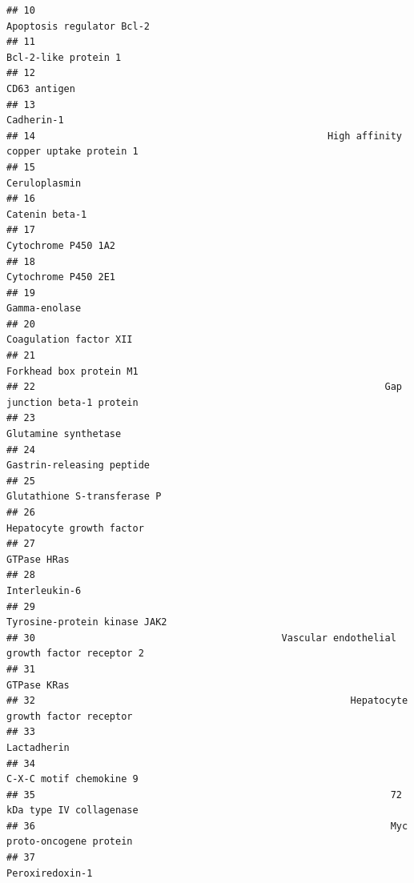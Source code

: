 \documentclass[
]{article}
\begin{document}
\begin{verbatim}
## 10                                                                Apoptosis regulator Bcl-2
## 11                                                                    Bcl-2-like protein 1 
## 12                                                                            CD63 antigen 
## 13                                                                              Cadherin-1 
## 14                                                   High affinity copper uptake protein 1 
## 15                                                                           Ceruloplasmin 
## 16                                                                          Catenin beta-1 
## 17                                                                     Cytochrome P450 1A2 
## 18                                                                     Cytochrome P450 2E1 
## 19                                                                           Gamma-enolase 
## 20                                                                  Coagulation factor XII 
## 21                                                                 Forkhead box protein M1 
## 22                                                             Gap junction beta-1 protein 
## 23                                                                    Glutamine synthetase 
## 24                                                               Gastrin-releasing peptide 
## 25                                                             Glutathione S-transferase P 
## 26                                                                Hepatocyte growth factor 
## 27                                                                             GTPase HRas 
## 28                                                                           Interleukin-6 
## 29                                                            Tyrosine-protein kinase JAK2 
## 30                                           Vascular endothelial growth factor receptor 2 
## 31                                                                             GTPase KRas 
## 32                                                       Hepatocyte growth factor receptor 
## 33                                                                             Lactadherin 
## 34                                                                 C-X-C motif chemokine 9 
## 35                                                              72 kDa type IV collagenase 
## 36                                                              Myc proto-oncogene protein 
## 37                                                                         Peroxiredoxin-1 

\end{verbatim}
\end{document}
